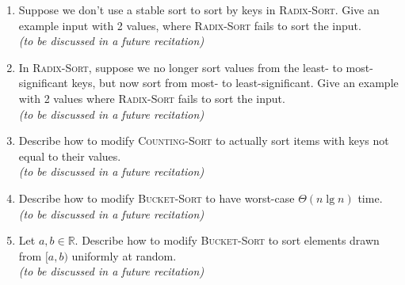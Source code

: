 \documentclass[letterpaper,11pt]{article}
\begin{document}
\begin{enumerate}
\item Suppose we don't use a stable sort to sort by keys in \textsc{Radix-Sort}. Give an example input with 2 values, where \textsc{Radix-Sort} fails to sort the input.\\
\emph{(to be discussed in a future recitation)}
\vspace*{6cm}

\item In \textsc{Radix-Sort}, suppose we no longer sort values from the least- to most-significant keys, but now sort from most- to least-significant. Give an example with 2 values where \textsc{Radix-Sort} fails to sort the input.\\
\emph{(to be discussed in a future recitation)}
\vspace*{6cm}

\item Describe how to modify \textsc{Counting-Sort} to actually sort items with keys not equal to their values.\\
\emph{(to be discussed in a future recitation)}
\vspace*{4cm}

\newpage

\item Describe how to modify \textsc{Bucket-Sort} to have worst-case $\Theta(n\lg n)$ time.\\
\emph{(to be discussed in a future recitation)}
\vspace*{6cm}

\item Let $a,b\in \mathbb{R}$. Describe how to modify \textsc{Bucket-Sort} to sort elements drawn from $[a,b)$ uniformly at random.\\
\emph{(to be discussed in a future recitation)}
\vspace*{4cm}



\end{enumerate}
\end{document}
